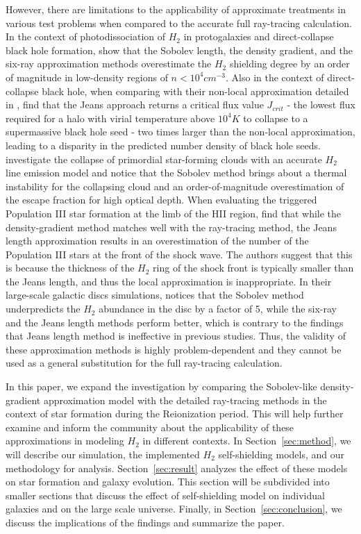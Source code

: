 \documentclass[linenumbers, twocolumn]{aastex631}
\begin{document}
However, there are limitations to the applicability of approximate treatments in various test problems when compared to the accurate full ray-tracing calculation. In the context of photodissociation of $H_{2}$ in protogalaxies and direct-collapse black hole formation, \cite{Wolcott-Green+2011} show that the Sobolev length, the density gradient, and the six-ray approximation methods overestimate the $H_{2}$ shielding degree by an order of magnitude in low-density regions of $n < 10^{4} cm^{-3}$. Also in the context of direct-collapse black hole, when comparing with their non-local approximation detailed in \cite{Hartwig+2015}, \cite{Hartwig+2015b} find that the Jeans approach returns a critical flux value $J_{crit}$ - the lowest flux required for a halo with virial temperature above $10^{4} K$ to collapse to a supermassive black hole seed - two times larger than the non-local approximation, leading to a disparity in the predicted number density of black hole seeds. \cite{Greif+2014} investigate the collapse of primordial star-forming clouds with an accurate $H_{2}$ line emission model and notice that the Sobolev method brings about a thermal instability for the collapsing cloud and an order-of-magnitude overestimation of the escape fraction for high optical depth. When evaluating the triggered Population III star formation at the limb of the HII region, \cite{Chiaki+2023a} find that while the density-gradient method matches well with the ray-tracing method, the Jeans length approximation results in an overestimation of the number of the Population III stars at the front of the shock wave. The authors suggest that this is because the thickness of the $H_{2}$ ring of the shock front is typically smaller than the Jeans length, and thus the local approximation is inappropriate. In their large-scale galactic discs simulations, \cite{Safranek-Shrader+2017} notices that the Sobolev method underpredicts the $H_{2}$ abundance in the disc by a factor of 5, while the six-ray and the Jeans length methods perform better, which is contrary to the findings that Jeans length method is ineffective in previous studies. Thus, the validity of these approximation methods is highly problem-dependent and they cannot be used as a general substitution for the full ray-tracing calculation. 

In this paper, we expand the investigation by comparing the Sobolev-like density-gradient approximation model \citep{Gnedin+2009} with the detailed ray-tracing methods in the context of star formation during the Reionization period. This will help further examine and inform the community about the applicability of these approximations in modeling $H_{2}$ in different contexts. In Section~\ref{sec:method}, we will describe our simulation, the implemented $H_{2}$ self-shielding models, and our methodology for analysis. Section~\ref{sec:result} analyzes the effect of these models on star formation and galaxy evolution. This section will be subdivided into smaller sections that discuss the effect of self-shielding model on individual galaxies and on the large scale universe. Finally, in Section~\ref{sec:conclusion}, we discuss the implications of the findings and summarize the paper. \\
\end{document}
